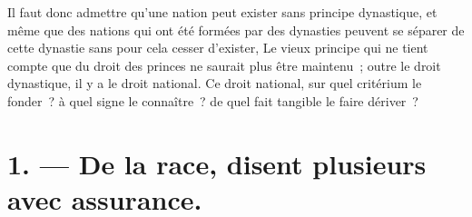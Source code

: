\documentclass[twoside]{book} %
\begin{document}
Il faut donc admettre qu’une nation peut exister sans principe dynastique, et même que des nations qui ont été formées par des dynasties peuvent se séparer de cette dynastie sans pour cela cesser d’exister, Le vieux principe qui ne tient compte que du droit des princes ne saurait plus être maintenu ; outre le droit dynastique, il y a le droit national. Ce droit national, sur quel critérium le fonder ? à quel signe le connaître ? de quel fait tangible le faire dériver ?\par

\section[{1. — De la race, disent plusieurs avec assurance.}]{1. — De la race, disent plusieurs avec assurance.}
\end{document}
